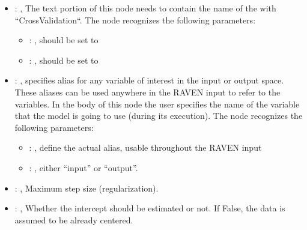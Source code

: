\begin{itemize}
\begin{itemize}
        \item {}: ,
          List of IDs of features/variables to include in the transformation process.

        \item {}: ,
          Which space to search? Target or Feature?
      \end{itemize}

    \item {}: ,
      The text portion of this node needs to contain the name of the  with
               ``CrossValidation``.
      The  node recognizes the following parameters:
        \begin{itemize}
          \item {}: ,
            should be set to 
          \item {}: ,
            should be set to 
      \end{itemize}

    \item {}: ,
      specifies alias for         any variable of interest in the input or output space. These
      aliases can be used anywhere in the RAVEN input to         refer to the variables. In the body
      of this node the user specifies the name of the variable that the model is going to use
      (during its execution).
      The  node recognizes the following parameters:
        \begin{itemize}
          \item {}: ,
            define the actual alias, usable throughout the RAVEN input
          \item {}: ,
            either ``input'' or ``output''.
      \end{itemize}

    \item {}: ,
      Maximum step size (regularization).

    \item {}: ,
      Whether the intercept should be estimated or not. If False,
      the data is assumed to be already centered.


\end{itemize}
